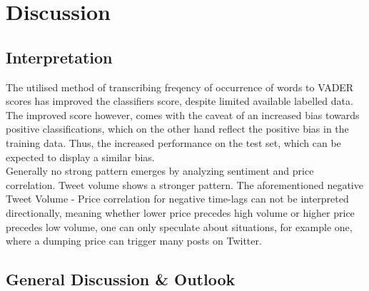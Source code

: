 \documentclass[11pt]{article}
\begin{document}
\section{Discussion}

\subsection{Interpretation}

The utilised method of transcribing freqency of occurrence of words to VADER scores has improved the classifiers score, despite limited available labelled data. The improved score however, comes with the caveat of an increased bias towards positive classifications, which on the other hand reflect the positive bias in the training data. Thus, the increased performance on the test set, which can be expected to display a similar bias. \\ 
Generally no strong pattern emerges by analyzing sentiment and price correlation. Tweet volume shows a stronger pattern. The aforementioned negative Tweet Volume - Price correlation for negative time-lags can not be interpreted directionally, meaning whether lower price precedes high volume or higher price precedes low volume, one can only speculate about situations, for example one, where a dumping price can trigger many posts on Twitter. \\

\subsection{General Discussion \& Outlook}
\end{document}
